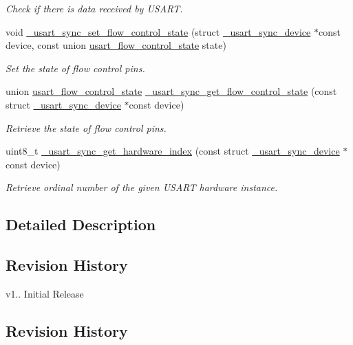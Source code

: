 \begin{DoxyCompactItemize}
\begin{DoxyCompactList}\small\item\em Check if there is data received by U\+S\+A\+RT. \end{DoxyCompactList}\item 
void \hyperlink{group___h_p_l_gae43bb6755eb8c462a9884e6cdca602aa}{\+\_\+usart\+\_\+sync\+\_\+set\+\_\+flow\+\_\+control\+\_\+state} (struct \hyperlink{struct__usart__sync__device}{\+\_\+usart\+\_\+sync\+\_\+device} $\ast$const device, const union \hyperlink{unionusart__flow__control__state}{usart\+\_\+flow\+\_\+control\+\_\+state} state)
\begin{DoxyCompactList}\small\item\em Set the state of flow control pins. \end{DoxyCompactList}\item 
union \hyperlink{unionusart__flow__control__state}{usart\+\_\+flow\+\_\+control\+\_\+state} \hyperlink{group___h_p_l_ga5b6662f283d7a2791c7eed77635e9238}{\+\_\+usart\+\_\+sync\+\_\+get\+\_\+flow\+\_\+control\+\_\+state} (const struct \hyperlink{struct__usart__sync__device}{\+\_\+usart\+\_\+sync\+\_\+device} $\ast$const device)
\begin{DoxyCompactList}\small\item\em Retrieve the state of flow control pins. \end{DoxyCompactList}\item 
uint8\+\_\+t \hyperlink{group___h_p_l_ga8fd6539ded0699161df00f23ba6580aa}{\+\_\+usart\+\_\+sync\+\_\+get\+\_\+hardware\+\_\+index} (const struct \hyperlink{struct__usart__sync__device}{\+\_\+usart\+\_\+sync\+\_\+device} $\ast$const device)
\begin{DoxyCompactList}\small\item\em Retrieve ordinal number of the given U\+S\+A\+RT hardware instance. \end{DoxyCompactList}\end{DoxyCompactItemize}


\subsection{Detailed Description}
\hypertarget{group___h_p_l_hpl_core_rev}{}\subsection{Revision History}\label{group___h_p_l_hpl_core_rev}

\begin{DoxyItemize}
\item v1.. Initial Release
\end{DoxyItemize}\hypertarget{group___h_p_l_hpl_ext_irq_rev}{}\subsection{Revision History}\label{group___h_p_l_hpl_ext_irq_rev}

